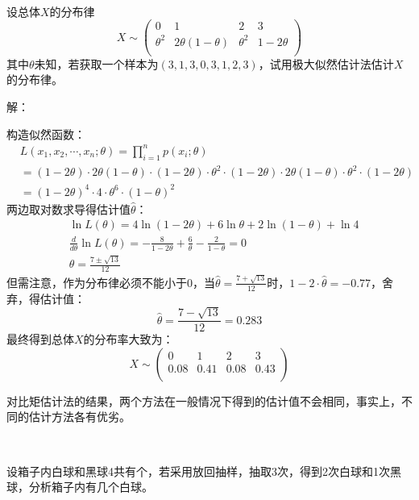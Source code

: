 ~

\begin{example}
设总体$X$的分布律
\[
X\sim \left( \begin{matrix}
    0&		1&		2&		3\\
    \theta ^2&		2\theta \left( 1-\theta \right)&		\theta ^2&		1-2\theta\\
\end{matrix} \right)
\]
其中$\theta $未知，若获取一个样本为$\left( 3,1,3,0,3,1,2,3 \right) $，试用极大似然估计法估计$X$的分布律。
\end{example}

解：

构造似然函数：
\begin{align*}
&L\left( x_1,x_2,\cdots ,x_n;\theta \right) =\prod_{i=1}^n{p\left( x_i;\theta \right)} \\
&=\left( 1-2\theta \right) \cdot 2\theta \left( 1-\theta \right) \cdot \left( 1-2\theta \right) \cdot \theta ^2\cdot \left( 1-2\theta \right) \cdot 2\theta \left( 1-\theta \right) \cdot \theta ^2\cdot \left( 1-2\theta \right) \\
&=\left( 1-2\theta \right) ^4\cdot 4\cdot \theta ^6\cdot \left( 1-\theta \right) ^2
\end{align*}
两边取对数求导得估计值$\hat{\theta}$：
\begin{align*}
&\ln L\left( \theta \right) =4\ln \left( 1-2\theta \right) +6\ln \theta +2\ln \left( 1-\theta \right) +\ln 4 \\
&\frac{d}{d\theta}\ln L\left( \theta \right) =-\frac{8}{1-2\theta}+\frac{6}{\theta}-\frac{2}{1-\theta}=0 \\
&\hat{\theta}=\frac{7\pm \sqrt{13}}{12}
\end{align*}
但需注意，作为分布律必须不能小于0，当$\hat{\theta}=\frac{7+\sqrt{13}}{12}$时，$1-2\cdot \hat{\theta}=-0.77$，舍弃，得估计值：
\[
\hat{\theta}=\frac{7-\sqrt{13}}{12}=0.283
\]
最终得到总体$X$的分布率大致为：
\[
X\sim \left( \begin{matrix}
	0&		1&		2&		3\\
	0.08&		0.41&		0.08&		0.43\\
\end{matrix} \right)
\]

\begin{tcolorbox}
对比矩估计法的结果，两个方法在一般情况下得到的估计值不会相同，事实上，不同的估计方法各有优劣。
\end{tcolorbox}

~

\begin{example}
设箱子内白球和黑球4共有个，若采用放回抽样，抽取3次，得到2次白球和1次黑球，分析箱子内有几个白球。
\end{example}

